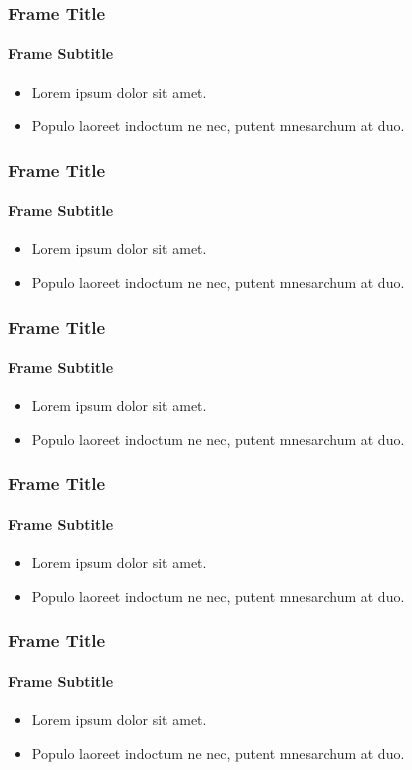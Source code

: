 \begin{frame}
\frametitle{Frame Title}
\framesubtitle{Frame Subtitle}
\begin{itemize}
	\item Lorem ipsum dolor sit amet.
	\item Populo laoreet indoctum ne nec, putent mnesarchum at duo.
\end{itemize}
\end{frame}


\begin{frame}
\frametitle{Frame Title}
\framesubtitle{Frame Subtitle}
\begin{itemize}
	\item Lorem ipsum dolor sit amet.
	\item Populo laoreet indoctum ne nec, putent mnesarchum at duo.
\end{itemize}
\end{frame}



\begin{frame}
\frametitle{Frame Title}
\framesubtitle{Frame Subtitle}
\begin{itemize}
	\item Lorem ipsum dolor sit amet.
	\item Populo laoreet indoctum ne nec, putent mnesarchum at duo.
\end{itemize}
\end{frame}


\begin{frame}
\frametitle{Frame Title}
\framesubtitle{Frame Subtitle}
\begin{itemize}
	\item Lorem ipsum dolor sit amet.
	\item Populo laoreet indoctum ne nec, putent mnesarchum at duo.
\end{itemize}
\end{frame}



\begin{frame}
\frametitle{Frame Title}
\framesubtitle{Frame Subtitle}
\begin{itemize}
	\item Lorem ipsum dolor sit amet.
	\item Populo laoreet indoctum ne nec, putent mnesarchum at duo.
\end{itemize}
\end{frame}



